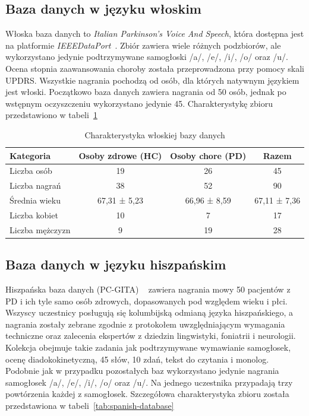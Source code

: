 \subsection{Baza danych w języku włoskim}
\label{subsec:wloska-baza}

Włoska baza danych to \emph{Italian Parkinson's Voice And Speech}, która dostępna jest na platformie \emph{IEEEDataPort}~\cite{italian-database}.
Zbiór zawiera wiele różnych podzbiorów, ale wykorzystano jedynie podtrzymywane samogłoski /a/, /e/, /i/, /o/ oraz /u/.
Ocena stopnia zaawansowania choroby została przeprowadzona przy pomocy skali UPDRS\@.
Wszystkie nagrania pochodzą od osób, dla których natywnym językiem jest włoski.
Początkowo baza danych zawiera nagrania od 50 osób, jednak po wstępnym oczyszczeniu wykorzystano jedynie 45.
Charakterystykę zbioru przedstawiono w tabeli~\ref{tab:italian-database}

\begin{table}[h]
\centering
\caption{Charakterystyka włoskiej bazy danych}
\label{tab:italian-database}
\begin{tabular}{|l|c|c|c|}
\hline
\textbf{Kategoria} &\textbf{Osoby zdrowe (HC)} &\textbf{Osoby chore (PD)} &\textbf{Razem} \\ \hline
Liczba osób &19 &26 &45\\ \hline
Liczba nagrań &38 &52 &90\\ \hline
Średnia wieku &67,31 ± 5,23 &66,96 ± 8,59  & 67,11 ± 7,36 \\ \hline
Liczba kobiet &10 &7 &17\\ \hline
Liczba mężczyzn &9 &19 &28 \\ \hline
\end{tabular}
\end{table}


\subsection{Baza danych w języku hiszpańskim}
\label{subsec:hiszpanska-baza}


Hiszpańska baza danych (PC-GITA) ~\cite{pc-gita} zawiera nagrania mowy 50 pacjentów z PD i ich tyle samo osób zdrowych, dopasowanych pod względem wieku i płci.
Wszyscy uczestnicy posługują się kolumbijską odmianą języka hiszpańskiego, a nagrania zostały zebrane zgodnie z protokołem uwzględniającym wymagania techniczne oraz zalecenia ekspertów z dziedzin lingwistyki, foniatrii i neurologii.
Kolekcja obejmuje takie zadania jak podtrzymywane wymawianie samogłosek, ocenę diadokokinetyczną, 45 słów, 10 zdań, tekst do czytania i monolog.
Podobnie jak w przypadku pozostałych baz wykorzystano jedynie nagrania samogłosek /a/, /e/, /i/, /o/ oraz /u/.
Na jednego uczestnika przypadają trzy powtórzenia każdej z samogłosek.
Szczegółowa charakterystyka zbioru została przedstawiona w tabeli~\ref{tab:spanish-database}

